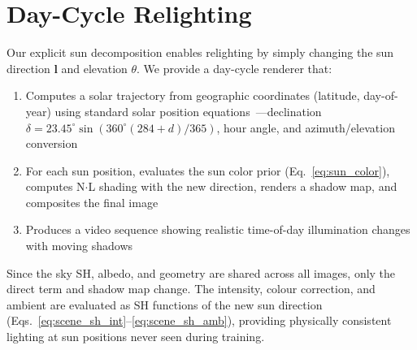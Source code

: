 \section{Day-Cycle Relighting}
\label{sec:relighting}

Our explicit sun decomposition enables relighting by simply changing the sun direction $\mathbf{l}$ and elevation $\theta$.
We provide a day-cycle renderer that:
\begin{enumerate}
    \item Computes a solar trajectory from geographic coordinates (latitude, day-of-year) using standard solar position equations~\cite{meeus1991astronomical}---declination $\delta = 23.45^\circ \sin(360^\circ(284+d)/365)$, hour angle, and azimuth/elevation conversion
    \item For each sun position, evaluates the sun color prior (Eq.~\ref{eq:sun_color}), computes N$\cdot$L shading with the new direction, renders a shadow map, and composites the final image
    \item Produces a video sequence showing realistic time-of-day illumination changes with moving shadows
\end{enumerate}

Since the sky SH, albedo, and geometry are shared across all images, only the direct term and shadow map change.
The intensity, colour correction, and ambient are evaluated as SH functions of the new sun direction (Eqs.~\ref{eq:scene_sh_int}--\ref{eq:scene_sh_amb}), providing physically consistent lighting at sun positions never seen during training.